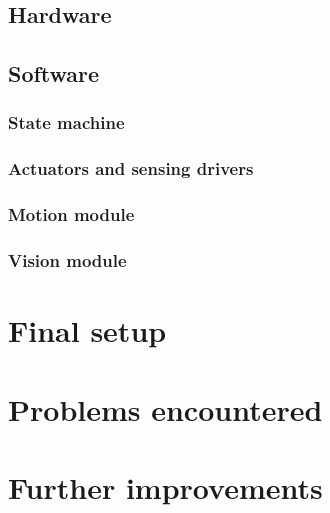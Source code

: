 \documentclass[11pt]{article}
\begin{document}
\subsection{Hardware}
	
	
\subsection{Software}



\subsubsection{State machine}



\subsubsection{Actuators and sensing drivers}


\subsubsection{Motion module}


\subsubsection{Vision module}


\section{ Final setup }


\section{Problems encountered}




\section{Further improvements}





\printbibliography
\end{document}
